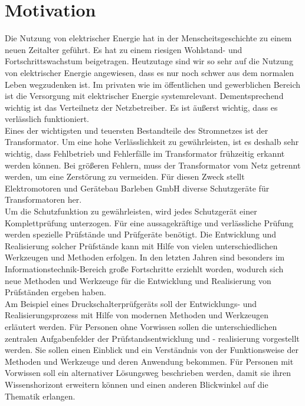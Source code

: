 \section{Motivation}
Die Nutzung von elektrischer Energie hat in der Menscheitsgeschichte
zu einem neuen Zeitalter geführt. Es hat zu einem riesigen Wohlstand-
und Fortschrittswachstum beigetragen. Heutzutage sind wir so sehr auf
die Nutzung von elektrischer Energie angewiesen, dass es nur noch schwer
aus dem normalen Leben wegzudenken ist. Im privaten wie im öffentlichen und
gewerblichen Bereich ist die Versorgung mit elektrischer Energie systemrelevant.
Dementsprechend wichtig ist das Verteilnetz der Netzbetreiber. Es ist äußerst wichtig,
dass es verlässlich funktioniert.
\\
Eines der wichtigsten und teuersten Bestandteile des Stromnetzes ist der Transformator.
Um eine hohe Verlässlichkeit zu gewährleisten, ist es deshalb sehr wichtig,
dass Fehlbetrieb und Fehlerfälle im Transformator frühzeitig erkannt werden können.
Bei größeren Fehlern, muss der Transformator vom Netz getrennt werden,
um eine Zerstörung zu vermeiden. Für diesen Zweck stellt Elektromotoren und Gerätebau Barleben GmbH
diverse Schutzgeräte für Transformatoren her.
\\
Um die Schutzfunktion zu gewährleisten, wird jedes Schutzgerät einer
Komplettprüfung unterzogen. Für eine aussagekräftige und verlässliche Prüfung
werden spezielle Prüfstände und Prüfgeräte benötigt. Die Entwicklung und Realisierung
solcher Prüfstände kann mit Hilfe von vielen unterschiedlichen Werkzeugen und Methoden
erfolgen. In den letzten Jahren sind besonders im Informationstechnik-Bereich große Fortschritte
erziehlt worden, wodurch sich neue Methoden und Werkzeuge für die Entwicklung und Realisierung
von Prüfständen ergeben haben.
\\
Am Beispiel eines Druckschalterprüfgeräts soll der Entwicklungs- und Realisierungsprozess mit Hilfe
von modernen Methoden und Werkzeugen erläutert werden. Für Personen ohne Vorwissen sollen die
unterschiedlichen zentralen Aufgabenfelder der Prüfstandsentwicklung und - realisierung vorgestellt werden.
Sie sollen einen Einblick und ein Verständnis von der Funktionsweise der Methoden und Werkzeuge und deren
Anwendung bekommen. Für Personen mit Vorwissen soll ein alternativer Lösungsweg beschrieben werden,
damit sie ihren Wissenshorizont erweitern können und einen anderen Blickwinkel auf die Thematik erlangen.

